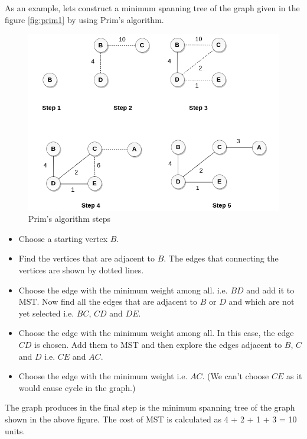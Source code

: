 \documentclass[a4paper,11pt]{book}
\begin{document}
\noindent As an example, lets construct a minimum spanning tree of the graph given in the figure \ref{fig:prim1} by using Prim's algorithm.

\begin{figure}[ht]
	\centering
	\includegraphics[scale=0.45]{code/sort/pic/prim2.png}
	\caption{Prim's algorithm steps}
\end{figure}

\begin{itemize}
    \item Choose a starting vertex $B$.
\item Find the vertices that are adjacent to $B$. The edges that connecting the vertices are shown by dotted lines.
\item Choose the edge with the minimum weight among all. i.e. $BD$ and add it to MST. Now find all the edges that are adjacent to $B$ or $D$ and which are not yet selected i.e. $BC$, $CD$ and $DE$.
\item Choose the edge with the minimum weight among all. In this case, the edge $CD$ is chosen. Add them to MST and then explore the edges adjacent to $B$, $C$ and $D$ i.e. $CE$ and $AC$.
\item Choose the edge with the minimum weight i.e. $AC$. (We can't choose $CE$ as it would cause cycle in the graph.)

\end{itemize}
\noindent The graph produces in the final step is the minimum spanning tree of the graph shown in the above figure. The cost of MST is calculated as 4 + 2 + 1 + 3 = 10 units.
\end{document}
